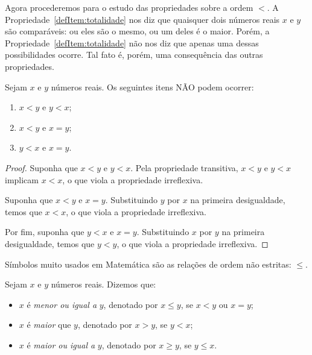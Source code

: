 Agora procederemos para o estudo das propriedades sobre a ordem $<$.
A Propriedade~\ref{defItem:totalidade} nos diz que quaisquer dois números reais $x$ e $y$ são comparáveis: ou eles são o mesmo, ou um deles é o maior.
Porém, a Propriedade~\ref{defItem:totalidade} não nos diz que apenas uma dessas possibilidades ocorre.
Tal fato é, porém, uma consequência das outras propriedades.

\begin{proposition}
    Sejam $x$ e $y$ números reais.
    Os seguintes itens NÃO podem ocorrer:
    \begin{enumerate}[label=(\alph*)]
        \item $x<y$ e $y<x$;
        \item $x<y$ e $x=y$;
        \item $y<x$ e $x=y$.
    \end{enumerate}
\end{proposition}
\begin{proof}
    Suponha que $x<y$ e $y<x$.
    Pela propriedade transitiva, $x<y$ e $y<x$ implicam $x<x$, o que viola a propriedade irreflexiva.

    Suponha que $x<y$ e $x=y$.
    Substituindo $y$ por $x$ na primeira desigualdade, temos que $x<x$, o que viola a propriedade irreflexiva.

    Por fim, suponha que $y<x$ e $x=y$.
    Substituindo $x$ por $y$ na primeira desigualdade, temos que $y<y$, o que viola a propriedade irreflexiva.
\end{proof}

Símbolos muito usados em Matemática são as relações de ordem não estritas: $\leq$.

\begin{definition}
    Sejam $x$ e $y$ números reais.
    Dizemos que:
    \begin{itemize}
        \item $x$ é \emph{menor ou igual a} $y$, denotado por $x\leq y$, se $x<y$ ou $x=y$;
        \item $x$ é \emph{maior} que $y$, denotado por $x>y$, se $y<x$;
        \item $x$ é \emph{maior ou igual a} $y$, denotado por $x\geq y$, se $y\leq x$.
    \end{itemize}
\end{definition}

